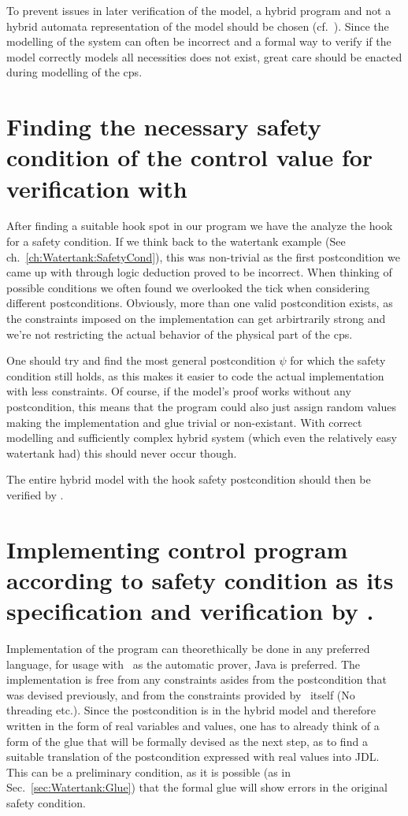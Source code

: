 To prevent issues in later verification of the model, a hybrid program and not a hybrid automata representation of the model should be chosen (cf.~\cite[ch.~1.1.4]{platzer2010b}). Since the modelling of the system can often be incorrect and a formal way to verify if the model correctly models all necessities does not exist, great care should be enacted during modelling of the cps.

\section{Finding the necessary safety condition of the control value for verification with \keym}
\label{sec:Process:SafetyCond}

After finding a suitable hook spot in our program we have the analyze the hook for a safety condition. If we think back to the watertank example (See ch.~\ref{ch:Watertank:SafetyCond}), this was non-trivial as the first postcondition we came up with through logic deduction proved to be incorrect. When thinking of possible conditions we often found we overlooked the tick when considering different postconditions. Obviously, more than one valid postcondition exists, as the constraints imposed on the implementation can get arbirtrarily strong and we're not restricting the actual behavior of the physical part of the cps. 

One should try and find the most general postcondition \(\psi\) for which the safety condition still holds, as this makes it easier to code the actual implementation with less constraints. Of course, if the model's proof works without any postcondition, this means that the program could also just assign random values making the implementation and glue trivial or non-existant. With correct modelling and sufficiently complex hybrid system (which even the relatively easy watertank had) this should never occur though.

The entire hybrid model with the hook safety postcondition should then be verified by \keym.

\section{Implementing control program according to safety condition as its specification and verification by \key.}
\label{sec:Process:Implementation}

Implementation of the program can theorethically be done in any preferred language, for usage with \key~as the automatic prover, Java is preferred. The implementation is free from any constraints asides from the postcondition that was devised previously, and from the constraints provided by \key~itself (No threading etc.). Since the postcondition is in the hybrid model and therefore written in the form of real variables and values, one has to already think of a form of the glue that will be formally devised as the next step, as to find a suitable translation of the postcondition expressed with real values into JDL. This can be a preliminary condition, as it is possible (as in Sec.~\ref{sec:Watertank:Glue}) that the formal glue will show errors in the original safety condition.

